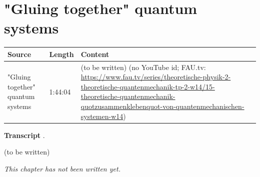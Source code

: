 \chapter{"Gluing together" quantum systems}\label{ch:c15}
\begin{paracol}{2}

\begin{sources}
\begin{tabularx}{\linewidth}{@{}l l L@{}}
\toprule
\textbf{Source} & \textbf{Length} & \textbf{Content}\\
\midrule
"Gluing together" quantum systems & 1:44:04 & (to be written) (no YouTube id; FAU.tv: \url{https://www.fau.tv/series/theoretische-physik-2-theoretische-quantenmechanik-tp-2-w14/15-theoretische-quantenmechanik-quotzusammenklebenquot-von-quantenmechanischen-systemen-w14})\\
\bottomrule
\end{tabularx}

\smallskip
\textbf{Transcript} .
\end{sources}

\begin{reading}
(to be written)
\end{reading}

\emph{This chapter has not been written yet.}

\flushside
\end{paracol}
